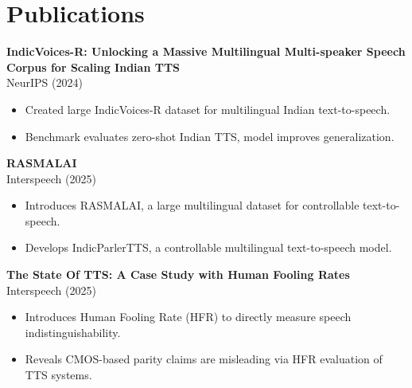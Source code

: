 \documentclass[a4paper,10pt]{article}
\begin{document}
\section*{Publications}
\textbf{IndicVoices-R: Unlocking a Massive Multilingual Multi-speaker Speech Corpus for Scaling Indian TTS} \\
NeurIPS (2024)
\begin{itemize}[noitemsep]
    \item Created large IndicVoices-R dataset for multilingual Indian text-to-speech.
    \item Benchmark evaluates zero-shot Indian TTS, model improves generalization.
\end{itemize}
\textbf{RASMALAI} \\
Interspeech (2025)
\begin{itemize}[noitemsep]
    \item Introduces RASMALAI, a large multilingual dataset for controllable text-to-speech.
    \item Develops IndicParlerTTS, a controllable multilingual text-to-speech model.
\end{itemize}
\textbf{The State Of TTS: A Case Study with Human Fooling Rates} \\
Interspeech (2025)
\begin{itemize}[noitemsep]
    \item Introduces Human Fooling Rate (HFR) to directly measure speech indistinguishability.
    \item Reveals CMOS-based parity claims are misleading via HFR evaluation of TTS systems.
\end{itemize}
\end{document}

